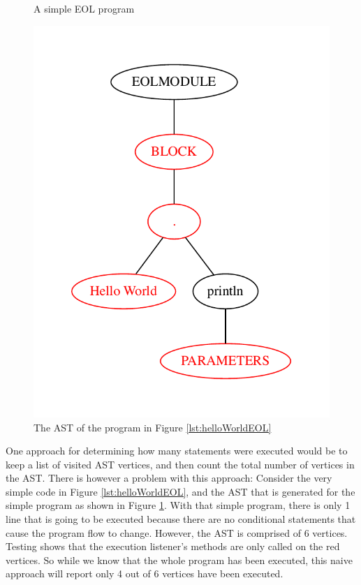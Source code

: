 \begin{figure}
\centering
\begin{minipage}[b]{.35\textwidth}
  \centering
  
  \caption{A simple EOL program}
  \label{lst:helloWorldEOL}
\end{minipage}%
\begin{minipage}{0.04\textwidth}
\hspace{1.00mm}
\end{minipage}
\begin{minipage}[b]{.6\textwidth}
  \centering
  \includegraphics[scale=0.5]{figures/HelloWorldAST.pdf}
  \caption{The AST of the program in Figure \ref{lst:helloWorldEOL}}
  \label{fig:helloWorldAST}
\end{minipage}
\end{figure}

One approach for determining how many statements were executed would be to keep a list of visited AST vertices, and then count the total number of vertices in the AST. There is however a problem with this approach: Consider the very simple code in Figure \ref{lst:helloWorldEOL}, and the AST that is generated for the simple program as shown in Figure \ref{fig:helloWorldAST}. With that simple program, there is only 1 line that is going to be executed because there are no conditional statements that cause the program flow to change. However, the AST is comprised of 6 vertices. Testing shows that the execution listener's methods are only called on the red vertices. So while we know that the whole program has been executed, this naive approach will report only 4 out of 6 vertices have been executed.

